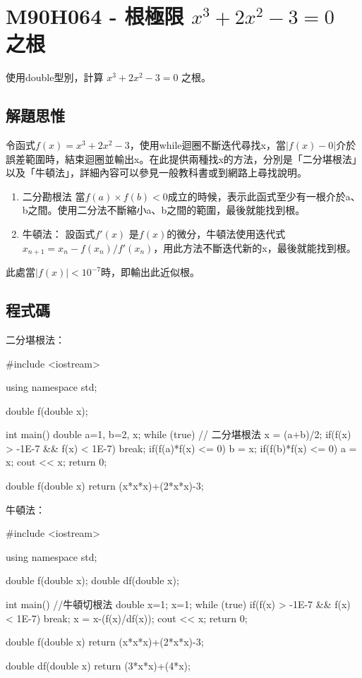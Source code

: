 \section{M90H064 - 根極限 $x^3+2x^2-3=0$ 之根}
\label{M90H064}
使用double型別，計算 $x^3+2x^2-3=0$ 之根。

\subsection{解題思惟}

令函式$f(x)=x^3+2x^2-3$，使用while迴圈不斷迭代尋找x，當$|f(x)-0|$介於誤差範圍時，結束迴圈並輸出x。在此提供兩種找x的方法，分別是「二分堪根法」以及「牛頓法」，詳細內容可以參見一般教科書或到網路上尋找說明。

\begin{enumerate}
	\item 二分勘根法
	當$f(a)\times f(b)<0$成立的時候，表示此函式至少有一根介於a、b之間。使用二分法不斷縮小a、b之間的範圍，最後就能找到根。
	\item 牛頓法：
	設函式$f'(x)$ 是$f(x)$的微分，牛頓法使用迭代式　$x_{n+1} = x_n - f(x_n)/f'(x_n)$，用此方法不斷迭代新的x，最後就能找到根。	
\end{enumerate}
此處當$|f(x)|<10^{-7}$時，即輸出此近似根。
\subsection{程式碼}
二分堪根法：
\begin{cppcode}
	#include <iostream>
	
	using namespace std;
	
	double f(double x);
	
	int main()
	{
		double a=1, b=2, x;
		while (true) {
			// 二分堪根法
			x = (a+b)/2;
			if(f(x) > -1E-7 && f(x) < 1E-7) break;
			if(f(a)*f(x) <= 0) b = x;
			if(f(b)*f(x) <= 0) a = x;
		}
		cout << x;		
		return 0;
	}
	
	double f(double x)
	{
		return (x*x*x)+(2*x*x)-3;
	}	
\end{cppcode}

牛頓法：

\begin{cppcode}
	#include <iostream>
	
	using namespace std;
	
	double f(double x);
	double df(double x);
	
	int main()
	{
		//牛頓切根法
		double x=1;		
		x=1;
		while (true) {
			if(f(x) > -1E-7 && f(x) < 1E-7) break;
			x = x-(f(x)/df(x));
		}
		cout << x;	
		return 0;
	}
	
	double f(double x)
	{
		return (x*x*x)+(2*x*x)-3;
	}
	
	double df(double x)
	{
		return (3*x*x)+(4*x);
	}
	
\end{cppcode}
